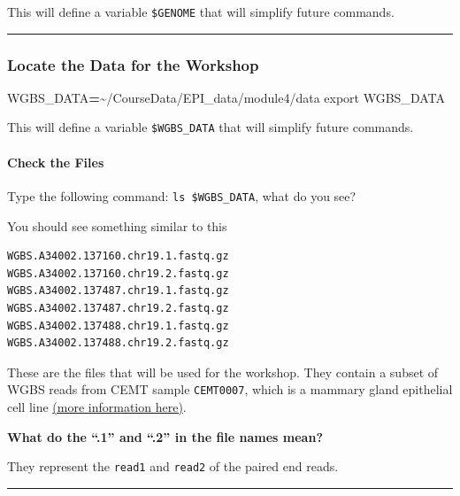 \documentclass[
]{book}
\newenvironment{Shaded}{\begin{snugshade}}{\end{snugshade}}
\newcommand{\BuiltInTok}[1]{#1}
\newcommand{\NormalTok}[1]{#1}
\newcommand{\OperatorTok}[1]{\textcolor[rgb]{0.81,0.36,0.00}{\textbf{#1}}}
\newcommand{\VariableTok}[1]{\textcolor[rgb]{0.00,0.00,0.00}{#1}}
\begin{document}
This will define a variable \texttt{\$GENOME} that will simplify future commands.

\begin{center}\rule{0.5\linewidth}{0.5pt}\end{center}

\subsubsection{Locate the Data for the Workshop}\label{locate-the-data-for-the-workshop}

\begin{Shaded}
\begin{Highlighting}[]
\VariableTok{WGBS\_DATA}\OperatorTok{=}\NormalTok{\textasciitilde{}/CourseData/EPI\_data/module4/data}
\BuiltInTok{export} \VariableTok{WGBS\_DATA}
\end{Highlighting}
\end{Shaded}

This will define a variable \texttt{\$WGBS\_DATA} that will simplify future commands.

\paragraph{Check the Files}\label{check-the-files}

Type the following command: \texttt{ls\ \$WGBS\_DATA}, what do you see?

You should see something similar to this

\begin{verbatim}
WGBS.A34002.137160.chr19.1.fastq.gz
WGBS.A34002.137160.chr19.2.fastq.gz
WGBS.A34002.137487.chr19.1.fastq.gz
WGBS.A34002.137487.chr19.2.fastq.gz
WGBS.A34002.137488.chr19.1.fastq.gz
WGBS.A34002.137488.chr19.2.fastq.gz
\end{verbatim}

These are the files that will be used for the workshop. They contain a subset of WGBS reads from CEMT sample \texttt{CEMT0007}, which is a mammary gland epithelial cell line \href{https://ega-archive.org/datasets/EGAD00001000685}{(more information here)}.

\textbf{What do the ``.1'' and ``.2'' in the file names mean?}

They represent the \texttt{read1} and \texttt{read2} of the paired end reads.

\begin{center}\rule{0.5\linewidth}{0.5pt}\end{center}
\end{document}
